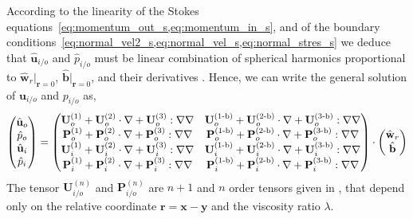 According to the linearity of the Stokes equations~\ref{eq:momentum_out_s,eq:momentum_in_s}, and of the boundary conditions~\ref{eq:normal_vel2_s,eq:normal_vel_s,eq:normal_stres_s} we deduce that $\hat{\textbf{u}}_{i/o}$ and $\hat{p}_{i/o}$  must be linear combination of spherical harmonics proportional to $\hat{\textbf{w}}_r|_{\textbf{r}=0}$, $\hat{\textbf{b}}|_{\textbf{r}=0}$, and their derivatives \citep{brenner1963resistance}.
Hence, we can write the general solution of $\textbf{u}_{i/o}$ and $p_{i/o}$ as,
\begin{align}
    \begin{pmatrix}
        \hat{\textbf{u}}_{o}\\
        \hat{p}_{o}\\
        \hat{\textbf{u}}_{i}\\
        \hat{p}_{i}
    \end{pmatrix}
    =
    \begin{pmatrix}
        \textbf{U}_{o}^{(1)} + \textbf{U}_{o}^{(2)}\cdot \grad + \textbf{U}_{o}^{(3)} :\grad\grad &
        \textbf{U}_{o}^\text{(1-b)} + \textbf{U}_{o}^\text{(2-b)}\cdot \grad + \textbf{U}_{o}^\text{(3-b)} :\grad\grad \\
        \textbf{P}_{o}^{(1)} + \textbf{P}_{o}^{(2)}\cdot \grad + \textbf{P}_{o}^{(3)} :\grad\grad &
        \textbf{P}_{o}^\text{(1-b)} + \textbf{P}_{o}^\text{(2-b)}\cdot \grad + \textbf{P}_{o}^\text{(3-b)} :\grad\grad \\
        \textbf{U}_{i}^{(1)} + \textbf{U}_{i}^{(2)}\cdot \grad + \textbf{U}_{i}^{(3)} :\grad\grad &
        \textbf{U}_{i}^\text{(1-b)} + \textbf{U}_{i}^\text{(2-b)}\cdot \grad + \textbf{U}_{i}^\text{(3-b)} :\grad\grad \\
        \textbf{P}_{i}^{(1)} + \textbf{P}_{i}^{(2)}\cdot \grad + \textbf{P}_{i}^{(3)} :\grad\grad &
        \textbf{P}_{i}^\text{(1-b)} + \textbf{P}_{i}^\text{(2-b)}\cdot \grad + \textbf{P}_{i}^\text{(3-b)} :\grad\grad \\
    \end{pmatrix}
    \cdot 
    \begin{pmatrix}
        \hat{\textbf{w}}_r\\
        \hat{\textbf{b}}
    \end{pmatrix}
    \label{eq:big_solution}
\end{align}
The tensor $\textbf{U}_{i/o}^{(n)}$ and $\textbf{P}_{i/o}^{(n)}$ are $n+1$ and $n$ order tensors given in \citet[Appendix F]{fintzi2025averaged}, that depend only on the relative coordinate $\textbf{r} = \textbf{x}-\textbf{y}$ and the viscosity ratio $\lambda$.
